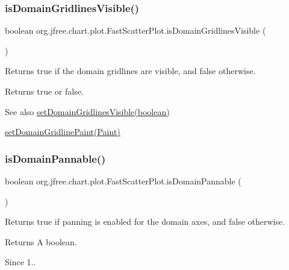 \subsubsection{\texorpdfstring{is\+Domain\+Gridlines\+Visible()}{isDomainGridlinesVisible()}}
{\footnotesize\ttfamily boolean org.\+jfree.\+chart.\+plot.\+Fast\+Scatter\+Plot.\+is\+Domain\+Gridlines\+Visible (\begin{DoxyParamCaption}{ }\end{DoxyParamCaption})}

Returns {\ttfamily true} if the domain gridlines are visible, and {\ttfamily false} otherwise.

\begin{DoxyReturn}{Returns}
{\ttfamily true} or {\ttfamily false}.
\end{DoxyReturn}
\begin{DoxySeeAlso}{See also}
\mbox{\hyperlink{classorg_1_1jfree_1_1chart_1_1plot_1_1_fast_scatter_plot_ac18fa3c1d2d933d3057a756e823f6d50}{set\+Domain\+Gridlines\+Visible(boolean)}} 

\mbox{\hyperlink{classorg_1_1jfree_1_1chart_1_1plot_1_1_fast_scatter_plot_af49e6d29cc7cc60458d27ace835c238d}{set\+Domain\+Gridline\+Paint(\+Paint)}} 
\end{DoxySeeAlso}
\mbox{\label{classorg_1_1jfree_1_1chart_1_1plot_1_1_fast_scatter_plot_af6289348bf124d368a03a593443a53e4}} 
\subsubsection{\texorpdfstring{is\+Domain\+Pannable()}{isDomainPannable()}}
{\footnotesize\ttfamily boolean org.\+jfree.\+chart.\+plot.\+Fast\+Scatter\+Plot.\+is\+Domain\+Pannable (\begin{DoxyParamCaption}{ }\end{DoxyParamCaption})}

Returns {\ttfamily true} if panning is enabled for the domain axes, and {\ttfamily false} otherwise.

\begin{DoxyReturn}{Returns}
A boolean.
\end{DoxyReturn}
\begin{DoxySince}{Since}
1.. 
\end{DoxySince}


